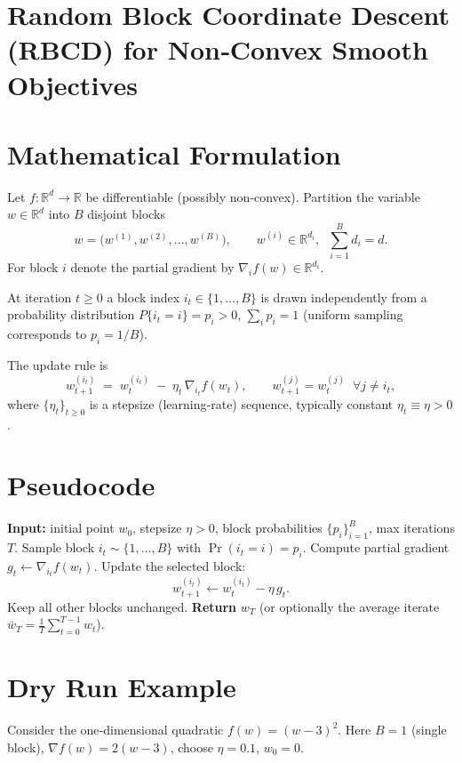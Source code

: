 \documentclass{article}
\begin{document}
\section*{Random Block Coordinate Descent (RBCD) for Non‑Convex Smooth Objectives}

\section*{Mathematical Formulation}
Let $f:\mathbb{R}^{d}\rightarrow\mathbb{R}$ be differentiable (possibly non‑convex).  
Partition the variable $w\in\mathbb{R}^{d}$ into $B$ disjoint blocks 
\[
w=\bigl(w^{(1)},w^{(2)},\dots ,w^{(B)}\bigr),\qquad 
w^{(i)}\in\mathbb{R}^{d_i},\;\; \sum_{i=1}^{B}d_i=d .
\]
For block $i$ denote the partial gradient by $\nabla_i f(w)\in\mathbb{R}^{d_i}$.

At iteration $t\ge 0$ a block index $i_t\in\{1,\dots ,B\}$ is drawn independently
from a probability distribution $P\{i_t=i\}=p_i>0$, $\sum_i p_i=1$ (uniform sampling corresponds to $p_i=1/B$).

The update rule is
\[
\boxed{
w_{t+1}^{(i_t)} \;=\; w_{t}^{(i_t)} \;-\; \eta_t \,\nabla_{i_t} f(w_t),\qquad 
w_{t+1}^{(j)} = w_{t}^{(j)}\;\;\forall j\neq i_t,
}
\tag{1}
\]
where $\{\eta_t\}_{t\ge0}$ is a stepsize (learning‑rate) sequence, typically constant
$\eta_t\equiv \eta>0$.

\section*{Pseudocode}
\begin{algorithm}[H]
\caption{Random Block Coordinate Descent (RBCD)}\label{alg:RBCD}
\begin{algorithmic}[1]
\STATE \textbf{Input:} initial point $w_0$, stepsize $\eta>0$, block probabilities $\{p_i\}_{i=1}^{B}$, max iterations $T$.
    \STATE Sample block $i_t\sim\{1,\dots ,B\}$ with $\Pr(i_t=i)=p_i$.
    \STATE Compute partial gradient $\displaystyle g_t\gets \nabla_{i_t} f(w_t)$.
    \STATE Update the selected block:
    \[
    w_{t+1}^{(i_t)} \gets w_{t}^{(i_t)} - \eta\, g_t .
    \]
    \STATE Keep all other blocks unchanged.
\ENDFOR
\STATE \textbf{Return} $w_T$ (or optionally the average iterate $\bar w_T=\frac1T\sum_{t=0}^{T-1}w_t$).
\end{algorithmic}
\end{algorithm}

\section*{Dry Run Example}
Consider the one‑dimensional quadratic $f(w)=(w-3)^2$.
Here $B=1$ (single block), $\nabla f(w)=2(w-3)$, choose $\eta=0.1$, $w_0=0$.
\end{document}
